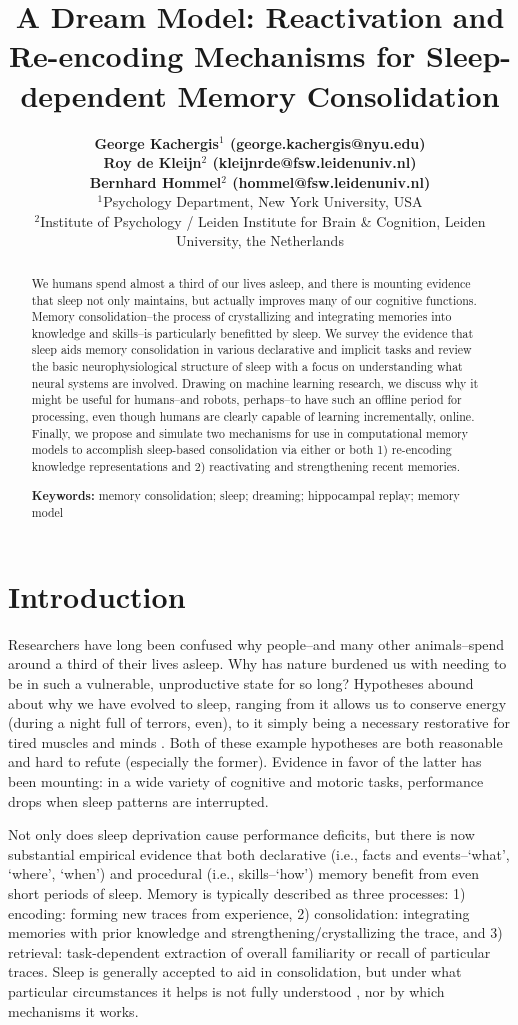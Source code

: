 \documentclass[10pt,letterpaper]{article}
\title{A Dream Model: Reactivation and Re-encoding Mechanisms for Sleep-dependent Memory Consolidation}
\author{{\large \bf George Kachergis$^{1}$ (george.kachergis@nyu.edu)} \\
 {\large \bf Roy de Kleijn$^{2}$ (kleijnrde@fsw.leidenuniv.nl)} \\
 {\large \bf Bernhard Hommel$^{2}$ (hommel@fsw.leidenuniv.nl)} \\
  $^{1}$Psychology Department, New York University, USA \\
  $^{2}$Institute of Psychology / Leiden Institute for Brain \& Cognition, Leiden University, the Netherlands}
\begin{document}
\maketitle


\begin{abstract}
We humans spend almost a third of our lives asleep, and there is mounting evidence that sleep not only maintains, but actually improves many of our cognitive functions. Memory consolidation--the process of crystallizing and integrating memories into knowledge and skills--is particularly benefitted by sleep. We survey the evidence that sleep aids memory consolidation in various declarative and implicit tasks and review the basic neurophysiological structure of sleep with a focus on understanding what neural systems are involved. Drawing on machine learning research, we discuss why it might be useful for humans--and robots, perhaps--to have such an offline period for processing, even though humans are clearly capable of learning incrementally, online. Finally, we propose and simulate two mechanisms for use in computational memory models to accomplish sleep-based consolidation via either or both 1) re-encoding knowledge representations and 2) reactivating and strengthening recent memories.

\textbf{Keywords:} 
memory consolidation; sleep; dreaming; hippocampal replay; memory model
\end{abstract}

\vspace{-.3cm}
\section{Introduction}

Researchers have long been confused why people--and many other animals--spend around a third of their lives asleep. Why has nature burdened us with needing to be in such a vulnerable, unproductive state for so long? Hypotheses abound about why we have evolved to sleep, ranging from it allows us to conserve energy (during a night full of terrors, even), to it simply being a necessary restorative for tired muscles and minds \cite{Siegel:2013}. Both of these example hypotheses are both reasonable and hard to refute (especially the former). Evidence in favor of the latter has been mounting: in a wide variety of cognitive and motoric tasks, performance drops when sleep patterns are interrupted. 

Not only does sleep deprivation cause performance deficits, but there is now substantial empirical evidence that both declarative (i.e., facts and events--`what', `where', `when') and procedural (i.e., skills--`how') memory benefit from even short periods of sleep. Memory is typically described as three processes: 1) encoding: forming new traces from experience, 2) consolidation: integrating memories with prior knowledge and strengthening/crystallizing the trace, and 3) retrieval: task-dependent extraction of overall familiarity or recall of particular traces. Sleep is generally accepted to aid in consolidation, but under what particular circumstances it helps is not fully understood \cite[for a review]{Diekelmann:2009}, nor by which mechanisms it works. 
\end{document}
